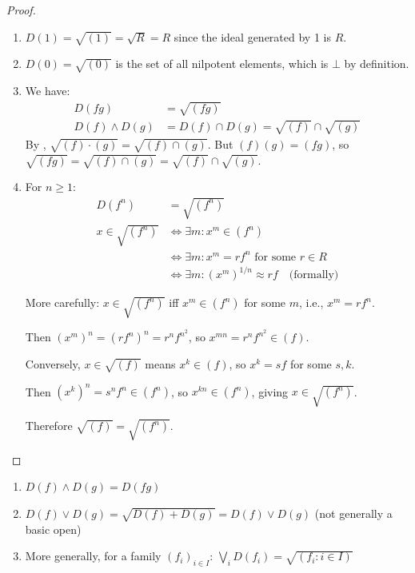 \begin{proof}
  \leanok
  \begin{enumerate}
    \item $D(1) = \sqrt{(1)} = \sqrt{R} = R$ since the ideal generated by 1 is $R$.
    
    \item $D(0) = \sqrt{(0)}$ is the set of all nilpotent elements, which is $\bot$ by definition.
    
    \item We have:
    \begin{align*}
      D(fg) &= \sqrt{(fg)} \\
      D(f) \land D(g) &= D(f) \cap D(g) = \sqrt{(f)} \cap \sqrt{(g)}
    \end{align*}
    By , $\sqrt{(f) \cdot (g)} = \sqrt{(f) \cap (g)}$. 
    But $(f)(g) = (fg)$, so $\sqrt{(fg)} = \sqrt{(f)\cap(g)} = \sqrt{(f)} \cap \sqrt{(g)}$.
    
    \item For $n \geq 1$:
    \begin{align*}
      D(f^n) &= \sqrt{(f^n)} \\
      x \in \sqrt{(f^n)} &\iff \exists m: x^m \in (f^n) \\
      &\iff \exists m: x^m = rf^n \text{ for some } r \in R \\
      &\iff \exists m: (x^m)^{1/n} \approx rf \quad \text{(formally)}
    \end{align*}
    
    More carefully: $x \in \sqrt{(f^n)}$ iff $x^m \in (f^n)$ for some $m$, i.e., $x^m = rf^n$.
    
    Then $(x^m)^n = (rf^n)^n = r^n f^{n^2}$, so $x^{mn} = r^n f^{n^2} \in (f)$.
    
    Conversely, $x \in \sqrt{(f)}$ means $x^k \in (f)$, so $x^k = sf$ for some $s, k$.
    
    Then $(x^k)^n = s^n f^n \in (f^n)$, so $x^{kn} \in (f^n)$, giving $x \in \sqrt{(f^n)}$.
    
    Therefore $\sqrt{(f)} = \sqrt{(f^n)}$.
  \end{enumerate}
\end{proof}

\begin{lemma}
  \label{lemma:basic-open-meet-join}
  \leanok
  \begin{enumerate}
    \item $D(f) \land D(g) = D(fg)$
    \item $D(f) \lor D(g) = \sqrt{D(f) + D(g)} = D(f) \lor D(g)$ (not generally a basic open)
    \item More generally, for a family $(f_i)_{i \in I}$: $\bigvee_i D(f_i) = \sqrt{(f_i : i \in I)}$
  \end{enumerate}
\end{lemma}

